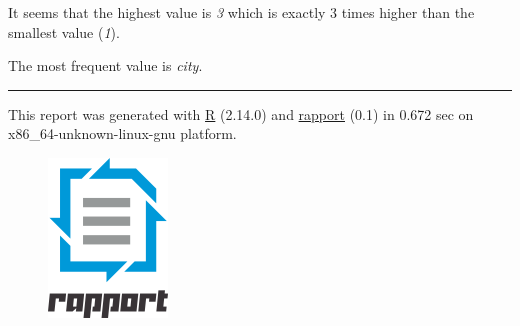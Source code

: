 \documentclass[]{article}
\makeatletter
\def\maxwidth{\ifdim\Gin@nat@width>\linewidth\linewidth
\else\Gin@nat@width\fi}
\let\Oldincludegraphics\includegraphics
\renewcommand{\includegraphics}[1]{\Oldincludegraphics[width=\maxwidth]{#1}}
\makeatother
\begin{document}
It seems that the highest value is \emph{3} which is exactly 3 times
higher than the smallest value (\emph{1}).

The most frequent value is \emph{city}.

\begin{center}\rule{3in}{0.4pt}\end{center}

This report was generated with \href{http://www.r-project.org/}{R}
(2.14.0) and \href{http://al3xa.github.com/rapport/}{rapport} (0.1) in
0.672 sec on x86\_64-unknown-linux-gnu platform.

\begin{figure}[htbp]
\centering
\includegraphics{images/logo.png}
\caption{}
\end{figure}
\end{document}
